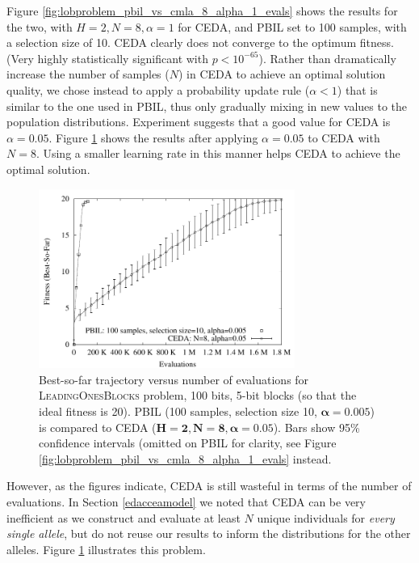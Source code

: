 \documentclass{sig-alt-full}
\begin{document}
Figure \ref{fig:lobproblem_pbil_vs_cmla_8_alpha_1_evals} shows the results for the two, with \(H=2, N=8, \alpha=1\) for CEDA, and PBIL set to 100 samples, with a selection size of 10.  CEDA clearly does not converge to the optimum fitness.  (Very highly statistically significant with \(p<10^{-65}\)).  Rather than dramatically increase the number of samples (\(N\)) in CEDA to achieve an optimal solution quality, we chose instead to apply a probability update rule (\(\alpha < 1\)) that is similar to the one used in PBIL, thus only gradually mixing in new values to the population distributions.  Experiment suggests that a good value for CEDA is \(\alpha=0.05\).  Figure \ref{fig:lobproblem_pbil_vs_cmla_8_alpha_0p05_evals} shows the results after applying \(\alpha=0.05\) to CEDA with \(N=8\). Using a smaller learning rate in this manner helps CEDA to achieve the optimal solution.

\begin{figure}[t]
\begin{center}
\includegraphics[width=3.3in]{lobproblem_pbil_vs_cmla_8_alpha_0p05_evals}
\end{center}
\caption{Best-so-far trajectory versus number of evaluations for
\textsc{LeadingOnesBlocks} problem, 100 bits, 5-bit blocks (so that the ideal fitness is 20). PBIL (100 samples, selection size 10, \(\bm{\alpha=0.005}\)) is compared to CEDA (\(\bm{H=2, N=8, \alpha=0.05}\)).  Bars show 95\% confidence intervals (omitted on PBIL for clarity, see Figure \ref{fig:lobproblem_pbil_vs_cmla_8_alpha_1_evals} instead.}
\label{fig:lobproblem_pbil_vs_cmla_8_alpha_0p05_evals}
\end{figure}

However, as the figures indicate, CEDA is still wasteful in terms of the number of evaluations.  In Section \ref{edacceamodel} we noted that CEDA can be very inefficient as we construct and evaluate at least \(N\) unique individuals for {\it every single allele}, but do not reuse our results to inform the distributions for the other alleles.  Figure \ref{fig:lobproblem_pbil_vs_cmla_8_alpha_0p05_evals} illustrates this problem.
\end{document}
